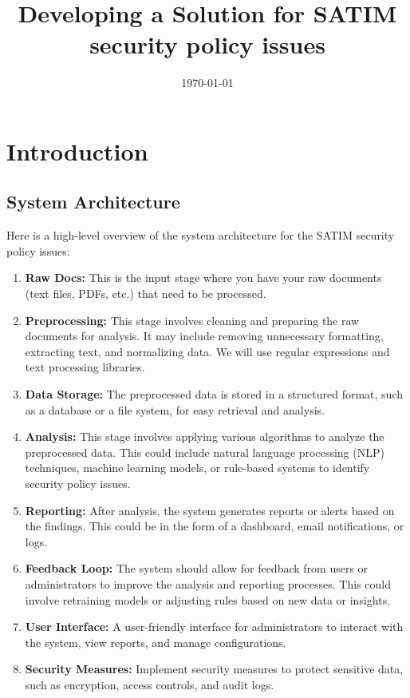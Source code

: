 \documentclass{article}
\title{Developing a Solution for SATIM security policy issues}
\author{} %
\date{\today}
\begin{document}
\maketitle

\section{Introduction}
\subsection{System Architecture}
Here is a high-level overview of the system architecture for the SATIM security policy issues:

\begin{enumerate}
    \item \textbf{Raw Docs:} This is the input stage where you have your raw documents (text files, PDFs, etc.) that need to be processed.
    \item \textbf{Preprocessing:} This stage involves cleaning and preparing the raw documents for analysis. It may include removing unnecessary formatting, extracting text, and normalizing data. We will use regular expressions and text processing libraries.
    \item \textbf{Data Storage:} The preprocessed data is stored in a structured format, such as a database or a file system, for easy retrieval and analysis.
    \item \textbf{Analysis:} This stage involves applying various algorithms to analyze the preprocessed data. This could include natural language processing (NLP) techniques, machine learning models, or rule-based systems to identify security policy issues.
    \item \textbf{Reporting:} After analysis, the system generates reports or alerts based on the findings. This could be in the form of a dashboard, email notifications, or logs.
    \item \textbf{Feedback Loop:} The system should allow for feedback from users or administrators to improve the analysis and reporting processes. This could involve retraining models or adjusting rules based on new data or insights.
    \item \textbf{User Interface:} A user-friendly interface for administrators to interact with the system, view reports, and manage configurations.
    \item \textbf{Security Measures:} Implement security measures to protect sensitive data, such as encryption, access controls, and audit logs.
\end{enumerate}
\end{document}
